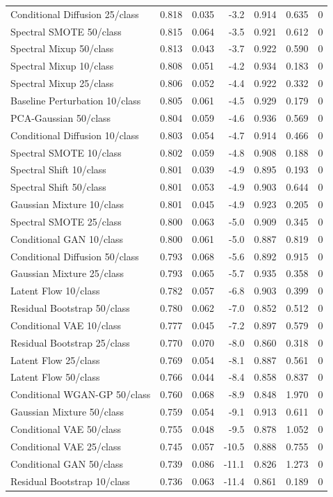 \begin{table}[t]
\begin{tabular}{lrrrrrr}
Conditional Diffusion 25/class & 0.818 & 0.035 & -3.2 & 0.914 & 0.635 & 0 \\
Spectral SMOTE 50/class & 0.815 & 0.064 & -3.5 & 0.921 & 0.612 & 0 \\
Spectral Mixup 50/class & 0.813 & 0.043 & -3.7 & 0.922 & 0.590 & 0 \\
Spectral Mixup 10/class & 0.808 & 0.051 & -4.2 & 0.934 & 0.183 & 0 \\
Spectral Mixup 25/class & 0.806 & 0.052 & -4.4 & 0.922 & 0.332 & 0 \\
Baseline Perturbation 10/class & 0.805 & 0.061 & -4.5 & 0.929 & 0.179 & 0 \\
PCA-Gaussian 50/class & 0.804 & 0.059 & -4.6 & 0.936 & 0.569 & 0 \\
Conditional Diffusion 10/class & 0.803 & 0.054 & -4.7 & 0.914 & 0.466 & 0 \\
Spectral SMOTE 10/class & 0.802 & 0.059 & -4.8 & 0.908 & 0.188 & 0 \\
Spectral Shift 10/class & 0.801 & 0.039 & -4.9 & 0.895 & 0.193 & 0 \\
Spectral Shift 50/class & 0.801 & 0.053 & -4.9 & 0.903 & 0.644 & 0 \\
Gaussian Mixture 10/class & 0.801 & 0.045 & -4.9 & 0.923 & 0.205 & 0 \\
Spectral SMOTE 25/class & 0.800 & 0.063 & -5.0 & 0.909 & 0.345 & 0 \\
Conditional GAN 10/class & 0.800 & 0.061 & -5.0 & 0.887 & 0.819 & 0 \\
Conditional Diffusion 50/class & 0.793 & 0.068 & -5.6 & 0.892 & 0.915 & 0 \\
Gaussian Mixture 25/class & 0.793 & 0.065 & -5.7 & 0.935 & 0.358 & 0 \\
Latent Flow 10/class & 0.782 & 0.057 & -6.8 & 0.903 & 0.399 & 0 \\
Residual Bootstrap 50/class & 0.780 & 0.062 & -7.0 & 0.852 & 0.512 & 0 \\
Conditional VAE 10/class & 0.777 & 0.045 & -7.2 & 0.897 & 0.579 & 0 \\
Residual Bootstrap 25/class & 0.770 & 0.070 & -8.0 & 0.860 & 0.318 & 0 \\
Latent Flow 25/class & 0.769 & 0.054 & -8.1 & 0.887 & 0.561 & 0 \\
Latent Flow 50/class & 0.766 & 0.044 & -8.4 & 0.858 & 0.837 & 0 \\
Conditional WGAN-GP 50/class & 0.760 & 0.068 & -8.9 & 0.848 & 1.970 & 0 \\
Gaussian Mixture 50/class & 0.759 & 0.054 & -9.1 & 0.913 & 0.611 & 0 \\
Conditional VAE 50/class & 0.755 & 0.048 & -9.5 & 0.878 & 1.052 & 0 \\
Conditional VAE 25/class & 0.745 & 0.057 & -10.5 & 0.888 & 0.755 & 0 \\
Conditional GAN 50/class & 0.739 & 0.086 & -11.1 & 0.826 & 1.273 & 0 \\
Residual Bootstrap 10/class & 0.736 & 0.063 & -11.4 & 0.861 & 0.189 & 0 \\
\bottomrule
\end{tabular}
\end{table}
